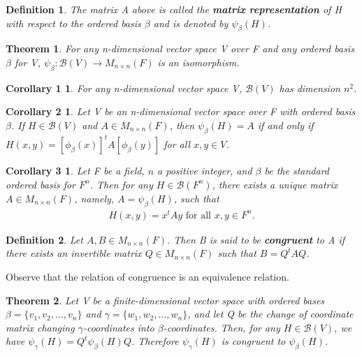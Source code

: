 \documentclass{article}
\newcommand{\bd}[1]{\textbf{#1}}
\theoremstyle{plain}
\newtheorem{theorem}{Theorem}[section]
\newtheorem*{corollary1}{Corollary 1}
\newtheorem*{corollary2}{Corollary 2}
\newtheorem*{corollary3}{Corollary 3}
\newtheorem*{definition1}{Definition}
\theoremstyle{plain} %
\begin{document}
\begin{definition1}
  The matrix A above is called the \bd{matrix representation} of H with respect to the ordered basis $\beta$ and is denoted by $\psi_\beta(H)$.
\end{definition1}

\begin{theorem}
  For any n-dimensional vector space V over F and any ordered basis $\beta$ for V, $\psi_\beta : \mathcal B(V) \to M_{n\times n}(F)$ is an isomorphism.
\end{theorem}

\begin{corollary1}
  For any n-dimensional vector space V, $\mathcal B(V)$ has dimension $n^2$.
\end{corollary1}

\begin{corollary2}
  Let V be an n-dimensional vector space over F with ordered basis $\beta$. If $H \in \mathcal B(V)$ and $A \in M_{n\times n}(F)$, then $\psi_\beta(H) = A$ if and only if $H(x, y) = [\phi_\beta(x)]^tA[\phi_\beta(y)]$ for all $x, y \in V$.
\end{corollary2}

\begin{corollary3}
  Let F be a field, $n$ a positive integer, and $\beta$ be the standard ordered basis for $F^n$. Then for any $H \in \mathcal B(F^n)$, there exists a unique matrix $A \in M_{n\times n}(F)$, namely, $A = \psi_\beta(H)$, such that
  \begin{align*}
    H(x, y) = x^tAy\text{ for all }x, y \in F^n.
  \end{align*}
\end{corollary3}

\begin{definition1}
  Let $A, B \in M_{n\times n}(F)$. Then B is said to be \bd{congruent} to A if there exists an invertible matrix $Q \in M_{n\times n}(F)$ such that $B = Q^tAQ$.
\end{definition1}

Observe that the relation of congruence is an equivalence relation.

\begin{theorem}
  Let V be a finite-dimensional vector space with ordered bases $\beta = \{v_1, v_2, \ldots , v_n\}$ and $\gamma = \{w_1, w_2, \ldots , w_n\}$, and let Q be the change of coordinate matrix changing $\gamma$-coordinates into $\beta$-coordinates. Then, for any $H \in \mathcal B(V)$, we have $\psi_\gamma(H) = Q^t\psi_\beta(H)Q$. Therefore $\psi_\gamma(H)$ is congruent to $\psi_\beta(H)$.
\end{theorem}
\end{document}
